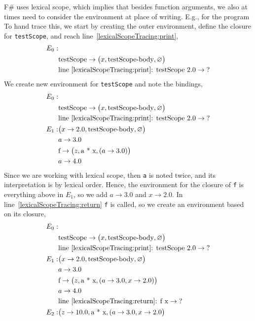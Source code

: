 F\# uses lexical scope, which implies that besides function arguments, we also at times need to consider the environment at place of writing. E.g., for the program
%
%
To hand trace this, we start by creating the outer environment, define the closure for \lstinline!testScope!, and reach line~\ref{lexicalScopeTracing:print},
\begin{align*}
  E_0:&\\
      &\text{testScope} \rightarrow \big(x, \text{testScope-body}, \varnothing\big)\\
      & \text{line~\ref{lexicalScopeTracing:print}: testScope 2.0} \rightarrow \text{?}\\
\end{align*}
We create new environment for \lstinline!testScope! and note the bindings,
\begin{align*}
  E_0:&\\
      &\text{testScope} \rightarrow \big(x, \text{testScope-body}, \varnothing\big)\\
      & \text{line~\ref{lexicalScopeTracing:print}: testScope 2.0} \rightarrow \text{?}\\
  E_1: & \big(x\rightarrow 2.0, \text{testScope-body}, \varnothing\big)\\
      & a \rightarrow 3.0\\
      & \text{f} \rightarrow \big(z, \text{a * x}, (a \rightarrow 3.0)\big)\\
      & a \rightarrow 4.0
\end{align*}
Since we are working with lexical scope, then \lstinline!a! is noted twice, and its interpretation is by lexical order. Hence, the environment for the closure of \lstinline!f! is everything above in $E_1$, so we add $a \rightarrow 3.0$ and $x \rightarrow 2.0$. In line~\ref{lexicalScopeTracing:return} \lstinline!f! is called, so we create an environment based on its closure,
\begin{align*}
  E_0:&\\
      &\text{testScope} \rightarrow \big(x, \text{testScope-body}, \varnothing\big)\\
      & \text{line~\ref{lexicalScopeTracing:print}: testScope 2.0} \rightarrow \text{?}\\
  E_1: & \big(x\rightarrow 2.0, \text{testScope-body}, \varnothing\big)\\
      & a \rightarrow 3.0\\
      & \text{f} \rightarrow \big(z, \text{a * x}, (a \rightarrow 3.0, x\rightarrow 2.0)\big)\\
      & a \rightarrow 4.0 \\
      & \text{line~\ref{lexicalScopeTracing:return}: f x} \rightarrow \text{?}\\
  E_2: & \big(z \rightarrow 10.0, \text{a * x}, (a \rightarrow 3.0, x\rightarrow 2.0\big)\\
\end{align*}
